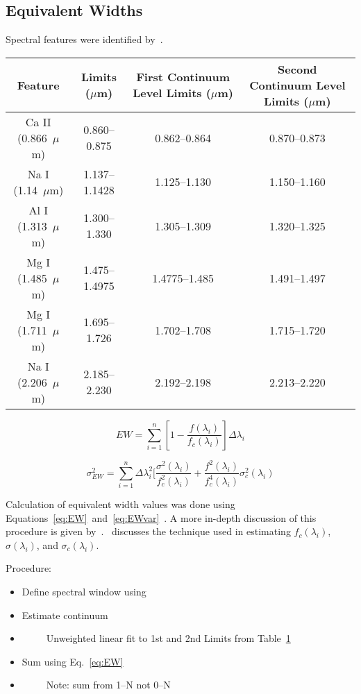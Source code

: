 \subsection{Equivalent Widths}


Spectral features were identified by~\cite{Rayner_2009}.  

\begin{table}[H]
	\begin{tabular}{c|c|c|c}
	\label{tab:features}
		Feature & Limits ($\mu$m) & First Continuum Level Limits ($\mu$m) & Second Continuum Level Limits ($\mu$m) \\ \hline
		Ca II (0.866~$\mu$m) & 0.860--0.875 & 0.862--0.864 & 0.870--0.873 \\
		Na I (1.14~$\mu$m) & 1.137--1.1428 & 1.125--1.130 & 1.150--1.160 \\
		Al I (1.313~$\mu$m) & 1.300--1.330 & 1.305--1.309 & 1.320--1.325 \\
		Mg I (1.485~$\mu$m) & 1.475--1.4975 & 1.4775--1.485 & 1.491--1.497 \\
		Mg I (1.711~$\mu$m) & 1.695--1.726 & 1.702--1.708 & 1.715--1.720 \\
		Na I (2.206~$\mu$m) & 2.185--2.230 & 2.192--2.198 & 2.213--2.220 \\
	\end{tabular}
\end{table}

\begin{equation}\label{eq:EW}
	EW = \sum_{i=1}^{n} [1 - \frac{f(\lambda_{i})}{f_{c}(\lambda_{i})}] \Delta\lambda_{i}
\end{equation}

\begin{equation}\label{eq:EWvar}
	\sigma_{EW}^{2} = \sum_{i=1}^{n} \Delta\lambda_{i}^{2} [\frac{\sigma^{2}(\lambda_{i})}{f_{c}^{2}(\lambda_{i})} + \frac{f^{2}(\lambda_{i})}{f_{c}^{4}(\lambda_{i})}\sigma_{c}^{2}(\lambda_{i})
\end{equation}


Calculation of equivalent width values was done using Equations~\ref{eq:EW}~and~\ref{eq:EWvar}~\cite{Cushing_2005}.  A more in-depth discussion of this procedure is given by~\cite{Cushing_2005}.  \cite{Sembach_1992}~discusses the technique used in estimating $f_{c}(\lambda_{i})$, $\sigma(\lambda_{i})$, and $\sigma_{c}(\lambda_{i})$.

Procedure:\\
\begin{itemize}
	\item{} Define spectral window using
	\item{} Estimate continuum
	\item{}~~~~~Unweighted linear fit to 1st and 2nd Limits from Table~\ref{tab:features}
	\item{} Sum using Eq.~\ref{eq:EW}
	\item{}~~~~~Note: sum from 1--N not 0--N
\end{itemize}



